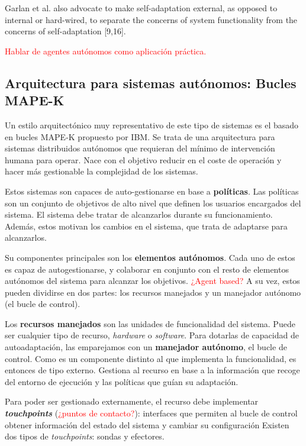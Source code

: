 Garlan et al. also advocate to make self-adaptation external, as opposed to internal or hard-wired, to separate the concerns of system
functionality from the concerns of self-adaptation [9,16].

\textcolor{red}{Hablar de agentes autónomos como aplicación práctica. \cite{savaglioAgentbasedInternetThings2020}}

\subsection{Arquitectura para sistemas autónomos: Bucles MAPE-K}
\label{sub:bucles-mapek}

Un estilo arquitectónico muy representativo de este tipo de sistemas es el basado en bucles MAPE-K \cite{ibmcorporationArchitecturalBlueprintAutonomic2006, fonsServiciosAdaptivereadyPara2021} propuesto por IBM. Se trata de una arquitectura para sistemas distribuidos autónomos que requieran del mínimo de intervención humana para operar. Nace con el objetivo reducir en el coste de operación y hacer más gestionable la complejidad de los sistemas.

Estos sistemas son capaces de auto-gestionarse en base a \textbf{políticas}. Las políticas son un conjunto de objetivos de alto nivel que definen los usuarios encargados del sistema. El sistema debe tratar de alcanzarlos durante su funcionamiento. Además, estos motivan los cambios en el sistema, que trata de adaptarse para alcanzarlos.

Su componentes principales son los \textbf{elementos autónomos}. Cada uno de estos es capaz de autogestionarse, y colaborar en conjunto con el resto de elementos autónomos del sistema  para alcanzar los objetivos. \textcolor{red}{¿Agent based?} A su vez, estos pueden dividirse en dos partes: los recursos manejados y un manejador autónomo (el bucle de control).

Los \textbf{recursos manejados} son las unidades de funcionalidad del sistema. Puede ser cualquier tipo de recurso, \emph{hardware} o \emph{software}. Para dotarlas de capacidad de autoadaptación, las emparejamos con un \textbf{manejador autónomo}, el bucle de control. Como es un componente distinto al que implementa la funcionalidad, es entonces de tipo externo. Gestiona al recurso en base a la información que recoge del entorno de ejecución y las políticas que guían su adaptación.

Para poder ser gestionado externamente, el recurso debe implementar \textbf{\emph{touchpoints}} (\textcolor{red}{¿puntos de contacto?}): interfaces que permiten al bucle de control obtener información del estado del sistema y cambiar su configuración Existen dos tipos de \emph{touchpoints}: sondas y efectores.

